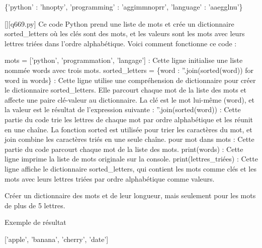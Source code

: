\{'python' : 'hnopty', 'programming' : 'aggimmnoprr', 'language' : 'aaegglnu'\}
        \par
        \begin{solution}
            \renewcommand{\nomfichier}{q669.py}
            \pythonfile{\chemincode \nomfichier}[][\nomfichier]
            Ce code Python prend une liste de mots et crée un dictionnaire sorted\_letters où les clés sont des mots, et les valeurs sont les mots avec leurs lettres triées dans l'ordre alphabétique. Voici comment fonctionne ce code :

    mots = ['python', 'programmation', 'langage'] : Cette ligne initialise une liste nommée words avec trois mots.
    sorted\_letters = \{word : ''.join(sorted(word)) for word in words\} : Cette ligne utilise une compréhension de dictionnaire pour créer le dictionnaire sorted\_letters. Elle parcourt chaque mot de la liste des mots et affecte une paire clé-valeur au dictionnaire. La clé est le mot lui-même (word), et la valeur est le résultat de l'expression suivante :
        ''.join(sorted(word)) : Cette partie du code trie les lettres de chaque mot par ordre alphabétique et les réunit en une chaîne. La fonction sorted est utilisée pour trier les caractères du mot, et join combine les caractères triés en une seule chaîne.
        pour mot dans mots : Cette partie du code parcourt chaque mot de la liste des mots.
    print(words) : Cette ligne imprime la liste de mots originale sur la console.
    print(lettres\_triées) : Cette ligne affiche le dictionnaire sorted\_letters, qui contient les mots comme clés et les mots avec leurs lettres triées par ordre alphabétique comme valeurs.
        \end{solution}
        

        \question
        Créer un dictionnaire des mots et de leur longueur, mais seulement pour les mots de plus de 5 lettres.

Exemple de résultat

['apple', 'banana', 'cherry', 'date']

